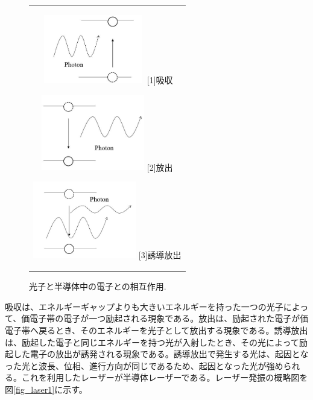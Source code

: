 \documentclass[11pt,a4j]{jsarticle}
\begin{document}
\begin{figure}[ht]
 \centering
 \begin{tabular}{c}

  \begin{minipage}{0.33\hsize}
   \centering
   \includegraphics[clip, width=4.5cm,height=3cm]{start_photon_abs.jpg}
   \hspace{1.6cm} [1]吸収
  \end{minipage}

  \begin{minipage}{0.33\hsize}
   \centering
   \includegraphics[clip, width=4.5cm]{start_photon_rel.jpg}
   \hspace{1.6cm} [2]放出
  \end{minipage}

  \begin{minipage}{0.33\hsize}
   \centering
   \includegraphics[clip, width=4.5cm]{start_photon_ind.jpg}
   \hspace{1.6cm} [3]誘導放出
  \end{minipage}
 \end{tabular}
 \caption{光子と半導体中の電子との相互作用.}
 \label{fig_semi1}

\end{figure}
吸収は、エネルギーギャップよりも大きいエネルギーを持った一つの光子によって、価電子帯の電子が一つ励起される現象である。放出は、励起された電子が価電子帯へ戻るとき、そのエネルギーを光子として放出する現象である。誘導放出は、励起した電子と同じエネルギーを持つ光が入射したとき、その光によって励起した電子の放出が誘発される現象である。誘導放出で発生する光は、起因となった光と波長、位相、進行方向が同じであるため、起因となった光が強められる。これを利用したレーザーが半導体レーザーである。レーザー発振の概略図を図\ref{fig_laser1}に示す。
\end{document}
